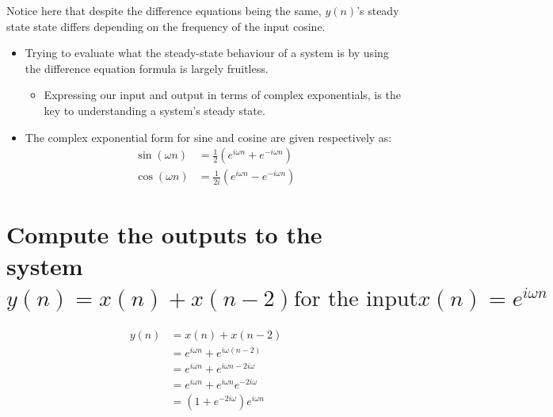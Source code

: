 \documentclass{article}
\begin{document}
Notice here that despite the difference equations being the same, $y(n)$'s steady state state differs depending on the frequency of the input cosine.

\vspace{.3cm}

\begin{itemize}
	\item Trying to evaluate what the steady-state behaviour of a system is by using the difference equation formula is largely fruitless.
	\begin{itemize}
		\item Expressing our input and output in terms of complex exponentials, is the key to understanding a system's steady state.
	\end{itemize}
	\item The complex exponential form for sine and cosine are given respectively as:
	\begin{align*}
		\sin({\omega}n) &= \frac{1}{2}(e^{i{\omega}n} + e^{-i{\omega}n}) \\
		\cos({\omega}n) &= \frac{1}{2i}(e^{i{\omega}n} - e^{-i{\omega}n})
	\end{align*}
\end{itemize}

\section[Example ~\thesection]{Compute the outputs to the system $y(n) = x(n) + x(n-2) \text{for the input} x(n) = e^{i{\omega}n}$}

\begin{align*}
	y(n) &= x(n) + x(n-2) \\
	&= e^{i{\omega}n} + e^{i{\omega}(n-2)} \\
	&= e^{i{\omega}n} + e^{i{\omega}n - 2i{\omega}} \\
	&= e^{i{\omega}n} + e^{i{\omega}n}e^{-2i{\omega}} \\
	&= (1 + e^{-2i{\omega}})e^{i{\omega}n}
\end{align*}

\vspace{.3cm}
\end{document}
